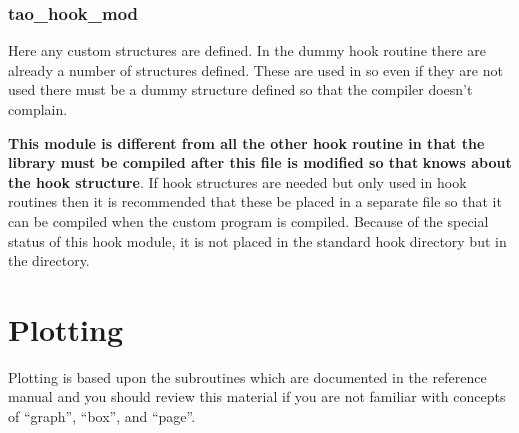 \subsection{tao\_hook\_mod}

Here any custom structures are defined. In the dummy hook routine there are
already a number of structures defined. These are used in
 so even if they are not used there must be a dummy
structure defined so that the compiler doesn't complain.

\textbf{This module is different from all the other hook routine in that the \tao
library must be compiled after this file is modified so that} 
\textbf{knows about the hook structure}. If hook structures are needed but only used in
hook routines then it is recommended that these be placed in a separate file so
that it can be compiled when the custom \tao program is compiled. Because of the
special status of this hook module, it is not placed in the standard hook
directory but in the  directory.

\chapter{Plotting}
\label{s:prog_plotting} 

Plotting is based upon the  subroutines which are
documented in the \bmad reference manual and you should review this
material if you are not familiar with concepts of ``graph'', ``box'',
and ``page''. 



